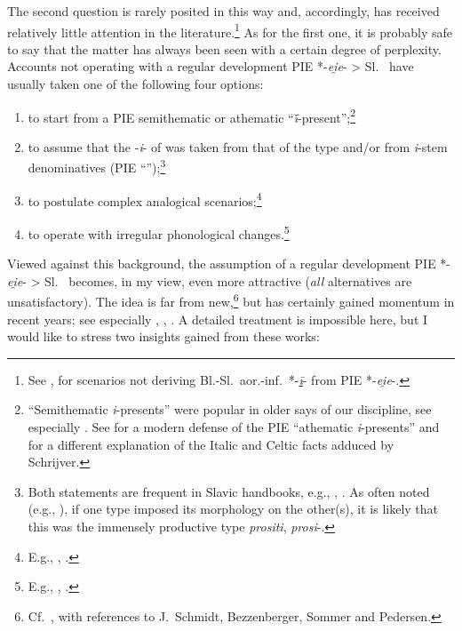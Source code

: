 \documentclass[output=paper,colorlinks,citecolor=brown]{langscibook}
\begin{document}
The second question is rarely posited in this way and, accordingly, has received relatively little attention in the literature.\footnote{See \citet[3]{Klingenschmitt1978}, \citet[207--208]{Jasanoff2017BSl} for scenarios not deriving Bl.-Sl.\ aor.-inf.\ *-\textit{\underline{ī}}- from PIE *-\textit{ei̯e}-.} As for the first one, it is probably safe to say that the matter has always been seen with a certain degree of perplexity. Accounts not operating with a regular development PIE *\nobreakdash-\textit{ei̯e}- > Sl.\  have usually taken one of the following four options:

\begin{enumerate}
    \item to start from a PIE semithematic or athematic “\textit{ī̆}-present”;\footnote{“Semithematic \textit{i}-presents” were popular in older says of our discipline, see especially \citet[23--29]{Stang1942}. See \citet{Schrijver2003athem} for a modern defense of the PIE “athematic \textit{i}-presents” and \citet[152--155]{Weiss2012} for a different explanation of the Italic and Celtic facts adduced by Schrijver.}
    \item to assume that the -\textit{i}- of  was taken from that of the  type  and/or from \textit{i}-stem denominatives (PIE “”);\footnote{Both statements are frequent in Slavic handbooks, e.g., \citet[439--440]{Vaillant1966}, \citet[91]{Birnbaum1997}. As often noted (e.g., \citealt[102--103]{Jasanoff1978}), if one type imposed its morphology on the other(s), it is likely that this was the immensely productive type \textit{prositi}, \textit{prosi}-.}
    \item to postulate complex analogical scenarios;\footnote{E.g., \citet{Kurylowicz1973}, \citet[3--5]{Klingenschmitt1978}.}
    \item to operate with irregular phonological changes.\footnote{E.g., \citet[260: syncope of the second vowel of *-\textit{ei̯e}-]{Matasovic2008}, \citet[60--69: Late Common Slavic contraction across \textit{jod}.]{Andersen2014}.}
\end{enumerate}

Viewed against this background, the assumption of a regular development PIE *-\textit{ei̯e}- > Sl.\  becomes, in my view, even more attractive (\emph{all} alternatives are unsatisfactory). The idea is far from new,\footnote{Cf.\ \citet[61--62; 78--79]{Specht1934}, with references to J.\ Schmidt, Bezzenberger, Sommer and Pedersen.} but has certainly gained momentum in recent years; see especially \citet{Hock1995}, \citet[214--222]{Hill2016}, \citet[74--76, 191, 194--199]{VillanuevaSvensson2023a}. A detailed treatment is impossible here, but I would like to stress two insights gained from these works:
\end{document}
